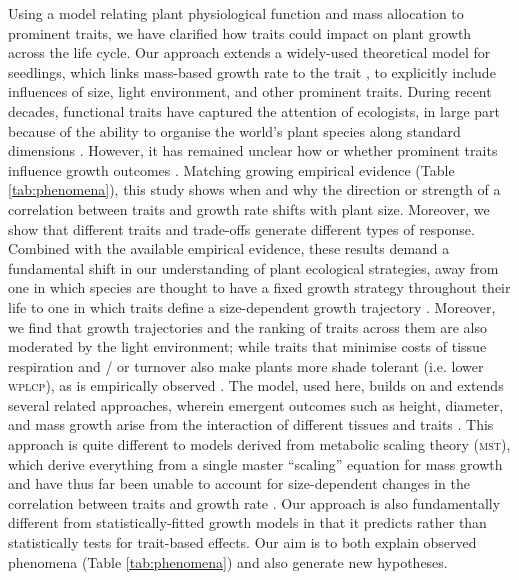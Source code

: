 \documentclass[9pt,twocolumn,twoside,lineno]{pnas-new}
\begin{document}
Using a model relating plant physiological function and mass allocation to prominent traits, we have clarified how traits could impact on plant growth across the life cycle. Our approach extends a widely-used theoretical model for seedlings, which links mass-based growth rate to the trait {\lma} \citep{Lambers-1992, Wright-2000}, to explicitly include influences of size, light environment, and other prominent traits. During recent decades, functional traits have captured the attention of ecologists, in large part because of the ability to organise the world's plant species along standard dimensions \citep{Westoby-2002}. However, it has remained unclear how or whether prominent traits influence growth outcomes \citep{Poorter-2008, Wright-2010,Paine-2015}. Matching growing empirical evidence (Table \ref{tab:phenomena}), this study shows when and why the direction or strength of a correlation between traits and growth rate shifts with plant size. Moreover, we show that different traits and trade-offs generate different types of response. Combined with the available empirical evidence, these results demand a fundamental shift in our understanding of plant ecological strategies, away from one in which species are thought to have a fixed growth strategy throughout their life \citep[e.g.][]{Grime-1977, Adler-2014, Paine-2015} to one in which traits define a size-dependent growth trajectory \citep{Gibert-2016}. Moreover, we find that growth trajectories and the ranking of traits across them are also moderated by the light environment; while traits that minimise costs of tissue respiration and / or turnover also make plants more shade tolerant (i.e. lower \textsc{wplcp}), as is empirically observed \citep{Messier-1999, Craine-2005, Poorter-2006, Baltzer-2007, Lusk-2008}. The {\plant} model, used here, builds on and extends several related approaches, wherein emergent outcomes such as height, diameter, and mass growth arise from the interaction of different tissues and traits \citep[e.g.][]{Givnish-1988, Makela-1997, Moorcroft-2001}. This approach is quite different to models derived from metabolic scaling theory (\textsc{mst}), which derive everything from a single master ``scaling'' equation for mass growth and have thus far been unable to account for size-dependent changes in the correlation between traits and growth rate \citep{Enquist-1999, Enquist-2007}. Our approach is also fundamentally different from statistically-fitted growth models \citep[e.g.][]{Herault-2011, Ruger-2012, Iida-2014} in that it predicts rather than statistically tests for trait-based effects. Our aim is to both explain observed phenomena (Table \ref{tab:phenomena}) and also generate new hypotheses.
\end{document}
